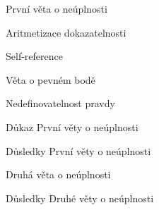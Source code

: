 \documentclass{beamer}
\begin{document}
\begin{frame}{První věta o neúplnosti}

    

\end{frame}


\begin{frame}{Aritmetizace dokazatelnosti}
    

\end{frame}


\begin{frame}{Self-reference}
    

\end{frame}


\begin{frame}{Věta o pevném bodě}
    

\end{frame}


\begin{frame}{Nedefinovatelnost pravdy}

    
\end{frame}


\begin{frame}{Důkaz První věty o neúplnosti}

    
\end{frame}


\begin{frame}{Důsledky První věty o neúplnosti}
    

\end{frame}


\begin{frame}{Druhá věta o neúplnosti}
    

\end{frame}


\begin{frame}{Důsledky Druhé věty o neúplnosti}

    
\end{frame}
\end{document}
